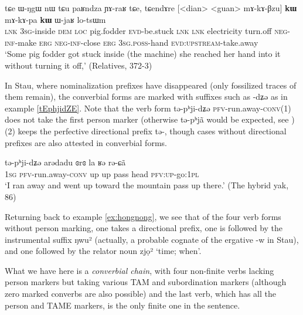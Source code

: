 \documentclass[oldfontcommands,oneside,a4paper,11pt]{article}
\newcommand{\ipa}[1]{{\phon \mbox{#1}}} %
\begin{document}
\begin{exe}
\ex \label{ex:mAkApa.kW}
\gll
\ipa{tɕe}   	\ipa{ɯ-ŋgɯ}   	\ipa{nɯ} \ipa{tɕu}   	\ipa{paʁndza}   	\ipa{ɲɤ-raʁ}   	\ipa{tɕe,}   	\ipa{tɕendɤre}   	[<dian>   	<guan>   	\ipa{mɤ-kɤ-βzu}] 	\ipa{\textbf{kɯ}}   	\ipa{mɤ-kɤ-pa}   	\ipa{\textbf{kɯ}}   	\ipa{ɯ-jaʁ}   	\ipa{lo-tsɯm}   \\
\textsc{lnk} \textsc{3sg}-inside \textsc{dem} \textsc{loc} pig.fodder \textsc{evd}-be.stuck \textsc{lnk}
\textsc{lnk} electricity turn.off \textsc{neg-inf}-make \textsc{erg}  \textsc{neg-inf}-close \textsc{erg}  \textsc{3sg.poss}-hand \textsc{evd:upstream}-take.away \\
\glt `Some pig fodder got stuck inside (the machine) she reached her hand into it without turning it off,' (Relatives, 372-3)
\end{exe} 

In Stau, where nominalization prefixes have disappeared (only  fossilized traces of them remain), the converbial forms are marked with suffixes such as \ipa{-dʑə} as in example \ref{tEphjidZE}. Note that the verb form \ipa{tə-pʰji-dʑə} \textsc{pfv}-run.away-\textsc{conv}(1) does not take the first person marker (otherwise \ipa{tə-pʰjã} would be expected, see \citealt{jacques14rtau}) (2) keeps the perfective directional prefix \ipa{tə-}, though cases without directional prefixes are also attested in converbial forms.

\begin{exe}
\ex \label{tEphjidZE}
\gll \ipa{ŋa} 	\ipa{tə-pʰji-dʑə} 	\ipa{arədadu} 	\ipa{ɞrɞ} 	\ipa{la} 	\ipa{ʁə} 	\ipa{rə-ɕã} \\
 \textsc{1sg} \textsc{pfv}-run.away-\textsc{conv} up up pass head \textsc{pfv:up}-go:\textsc{1pl} \\
\glt `I ran away and went up toward the mountain pass up there.' (The hybrid yak, 86) 
\end{exe}

Returning back to example \ref{ex:hongnong}, we see that of the four verb forms without person marking, one takes a directional prefix, one is followed by the instrumental suffix  \ipa{ŋwu²} (actually, a probable cognate of the ergative \ipa{-w} in Stau), and one followed by the relator noun  \ipa{zjọ²} `time; when'. 

What we have here is a \textit{converbial chain}, with four non-finite verbs lacking person markers but taking various TAM and subordination markers (although zero marked converbs are also possible) and the last verb, which has all the person and TAME markers, is the only finite one in the sentence.
\end{document}
